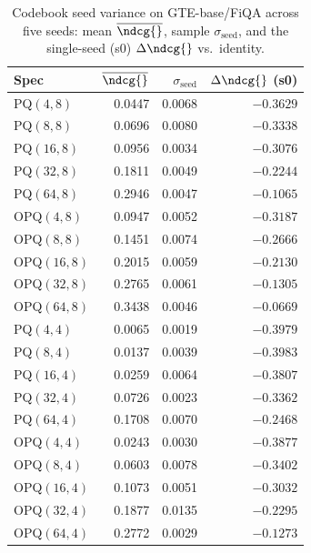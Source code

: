 \begin{table}[t]
\centering
\small
\caption{Codebook seed variance on GTE-base/FiQA across five seeds: mean $\overline{\ndcg{}}$, sample $\sigma_{\text{seed}}$, and the single-seed (s0) $\Delta\ndcg{}$ vs.\ identity.}
\label{tab:seed-variance-gte-base-fiqa}
\begin{tabular}{lrrr}
\toprule
Spec & $\overline{\ndcg{}}$ & $\sigma_{\text{seed}}$ & $\Delta\ndcg{}$ (s0) \\
\midrule
PQ$(4,8)$ & 0.0447 & 0.0068 & $-0.3629$ \\
PQ$(8,8)$ & 0.0696 & 0.0080 & $-0.3338$ \\
PQ$(16,8)$ & 0.0956 & 0.0034 & $-0.3076$ \\
PQ$(32,8)$ & 0.1811 & 0.0049 & $-0.2244$ \\
PQ$(64,8)$ & 0.2946 & 0.0047 & $-0.1065$ \\
OPQ$(4,8)$ & 0.0947 & 0.0052 & $-0.3187$ \\
OPQ$(8,8)$ & 0.1451 & 0.0074 & $-0.2666$ \\
OPQ$(16,8)$ & 0.2015 & 0.0059 & $-0.2130$ \\
OPQ$(32,8)$ & 0.2765 & 0.0061 & $-0.1305$ \\
OPQ$(64,8)$ & 0.3438 & 0.0046 & $-0.0669$ \\
PQ$(4,4)$ & 0.0065 & 0.0019 & $-0.3979$ \\
PQ$(8,4)$ & 0.0137 & 0.0039 & $-0.3983$ \\
PQ$(16,4)$ & 0.0259 & 0.0064 & $-0.3807$ \\
PQ$(32,4)$ & 0.0726 & 0.0023 & $-0.3362$ \\
PQ$(64,4)$ & 0.1708 & 0.0070 & $-0.2468$ \\
OPQ$(4,4)$ & 0.0243 & 0.0030 & $-0.3877$ \\
OPQ$(8,4)$ & 0.0603 & 0.0078 & $-0.3402$ \\
OPQ$(16,4)$ & 0.1073 & 0.0051 & $-0.3032$ \\
OPQ$(32,4)$ & 0.1877 & 0.0135 & $-0.2295$ \\
OPQ$(64,4)$ & 0.2772 & 0.0029 & $-0.1273$ \\
\bottomrule
\end{tabular}
\end{table}

